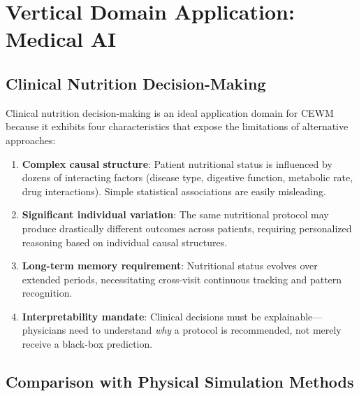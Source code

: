 \documentclass[11pt,a4paper]{article}
\newcommand{\CEWM}{\textsc{CEWM}}
\begin{document}
\section{Vertical Domain Application: Medical AI}\label{sec:medical}

\subsection{Clinical Nutrition Decision-Making}

Clinical nutrition decision-making is an ideal application domain for \CEWM{} because it exhibits four characteristics that expose the limitations of alternative approaches:
\begin{enumerate}[nosep]
  \item \textbf{Complex causal structure}: Patient nutritional status is influenced by dozens of interacting factors (disease type, digestive function, metabolic rate, drug interactions). Simple statistical associations are easily misleading.
  \item \textbf{Significant individual variation}: The same nutritional protocol may produce drastically different outcomes across patients, requiring personalized reasoning based on individual causal structures.
  \item \textbf{Long-term memory requirement}: Nutritional status evolves over extended periods, necessitating cross-visit continuous tracking and pattern recognition.
  \item \textbf{Interpretability mandate}: Clinical decisions must be explainable---physicians need to understand \emph{why} a protocol is recommended, not merely receive a black-box prediction.
\end{enumerate}

\subsection{Comparison with Physical Simulation Methods}
\end{document}
